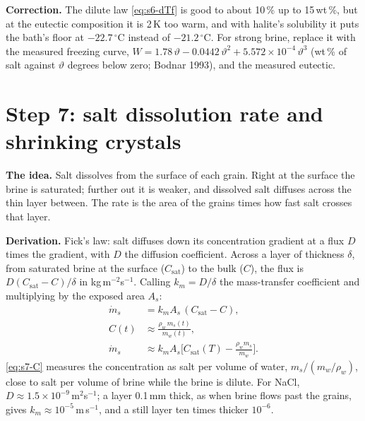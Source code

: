 \documentclass[11pt,a4paper]{article}
\newcommand{\dC}{\,{}^{\circ}\mathrm{C}}
\newcommand{\Csat}{C_{\mathrm{sat}}}
\newcommand{\para}[1]{\par\smallskip\noindent\textbf{#1}\enspace}
\begin{document}
\begin{correction}
\textbf{Correction.} The dilute law \eqref{eq:s6-dTf} is good to about 10\,\% up to 15\,wt\,\%, but at the
eutectic composition it is 2\,K too warm, and with halite's solubility it puts the bath's floor at
$-22.7\dC$ instead of $-21.2\dC$. For strong brine, replace it with the measured freezing curve,
$W = 1.78\,\vartheta - 0.0442\,\vartheta^2 + 5.572\times10^{-4}\,\vartheta^3$ (wt\,\% of salt against
$\vartheta$ degrees below zero; Bodnar 1993), and the measured eutectic.
\end{correction}

\section{Step 7: salt dissolution rate and shrinking crystals}\label{sec:s7}

\para{The idea.} Salt dissolves from the surface of each grain. Right at the surface the brine is
saturated; further out it is weaker, and dissolved salt diffuses across the thin layer between. The rate is
the area of the grains times how fast salt crosses that layer.

\para{Derivation.} Fick's law: salt diffuses down its concentration gradient at a flux $D$ times the
gradient, with $D$ the diffusion coefficient. Across a layer of thickness $\delta$, from saturated brine at
the surface ($\Csat$) to the bulk ($C$), the flux is $D(\Csat - C)/\delta$ in kg\,m$^{-2}$s$^{-1}$. Calling
$k_m = D/\delta$ the mass-transfer coefficient and multiplying by the exposed area $A_s$:
\begin{align}
\dot m_s &= k_mA_s\,(\Csat - C), \label{eq:s7-rate}\\
C(t) &\approx \frac{\rho_w\,m_s(t)}{m_w(t)}, \label{eq:s7-C}\\
\dot m_s &\approx k_mA_s\Big[\Csat(T) - \frac{\rho_w m_s}{m_w}\Big]. \label{eq:s7-rate2}
\end{align}
\eqref{eq:s7-C} measures the concentration as salt per volume of water, $m_s/(m_w/\rho_w)$, close to salt
per volume of brine while the brine is dilute. For NaCl, $D \approx 1.5\times10^{-9}$\,m$^2$s$^{-1}$; a
layer 0.1\,mm thick, as when brine flows past the grains, gives $k_m \approx 10^{-5}$\,m\,s$^{-1}$, and a still
layer ten times thicker $10^{-6}$.
\end{document}
